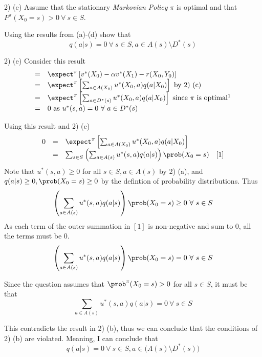 \documentclass[11pt,a4paper]{article}
\begin{document}
\begin{question}{2) (e)}
  Assume that the stationary \textit{Markovian Policy} $\pi$ is optimal and that $P^\pi(X_0=s)>0\ \forall\ s\in S$.
  \par Using the results from (a)-(d) show that
  \[ q(a|s)=0\ \forall \ s\in S,a\in A(s)\setminus D^*(s)\]
\end{question}

\begin{answer}{2) (e)}
  Consider this result
  \[\begin{array}{rl}
    =&\expect^\pi\left[v^*(X_0)-\alpha v^*(X_1)-r(X_0,Y_0)\right]\\
    =&\expect^\pi\left[\sum_{a\in A(X_0)}u^*(X_0,a)q(a|X_0)\right]\text{ by 2) (c)}\\
    =&\expect^\pi\left[\sum_{a\in D^*(s)}u^*(X_0,a)q(a|X_0)\right]\text{ since }\pi\text{ is optimal\footnotemark}\\
    =&0\text{ as }u^*(s,a)=0\ \forall\ a\in D^*(s)
  \end{array}\]

  Using this result and 2) (c)
  \[\begin{array}{rcl}
    0&=&\expect^\pi\left[\sum_{a\in A(X_0)}u^*(X_0,a)q(a|X_0)\right]\\
    &=&\sum_{s\in S}\left(\sum_{a\in A(s)}u^*(s,a)q(a|s)\right)\prob(X_0=s)\quad [1]
  \end{array}\]
  Note that $u^*(s,a)\geq0$ for all $s\in S,a\in A(s)$ by 2) (a), and $q(a|s)\geq0,\prob(X_0=s)\geq0$ by the defintion of probability distributions. Thus
  \[ \left(\sum_{a\in A(s)}u^*(s,a)q(a|s)\right)\prob(X_0=s)\geq0\ \forall\ s\in S\]
  As each term of the outer summation in $[1]$ is non-negative and sum to 0, all the terms must be 0.
  \[ \left(\sum_{a\in A(s)}u^*(s,a)q(a|s)\right)\prob(X_0=s)=0\ \forall\ s\in S \]
  \par Since the question assumes that $\prob^\pi(X_0=s)>0$ for all $s\in S$, it must be that
  \[ \sum_{a\in A(s)}u^*(s,a)q(a|s)=0\ \forall\ s\in S \]
  \par This contradicts the result in 2) (b), thus we can conclude that the conditions of 2) (b) are violated. Meaning, I can conclude that
  \[ q(a|s)=0\ \forall\ s\in S, a\in \big(A(s)\setminus D^*(s)\big) \]
\end{answer}
\end{document}
